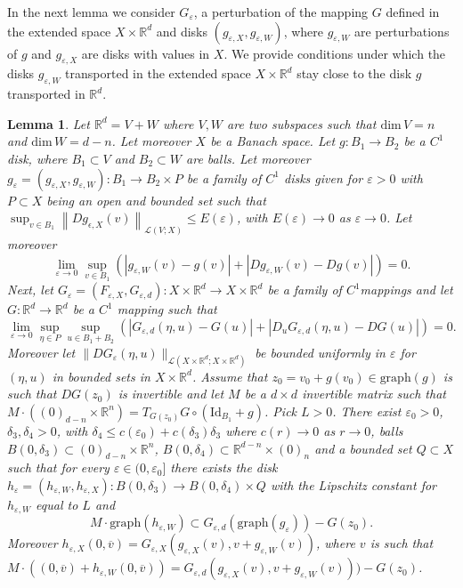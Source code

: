 \documentclass[11pt, leqno]{amsart}
\newtheorem{lem}[thm]{Lemma}
\theoremstyle{definition}
\def\R{\mathbb{R}}
\begin{document}
	In the next lemma we consider $G_\varepsilon$, a perturbation of the mapping $G$ defined in the extended space $X\times \R^d$ and disks $(g_{\varepsilon,X},g_{\varepsilon,W})$, where $g_{\varepsilon,W}$ are perturbations of $g$ and $g_{\varepsilon,X}$ are disks with values in $X$. We provide conditions under which the disks $g_{\varepsilon,W}$ transported in the extended space $X\times \R^d$ stay close  to the disk $g$ transported in $\R^d$.    	 	
	 	
	 	\begin{lem} \label{lem:transport_eps} Let $\R^d=V+W$ where $V,W$ are two subspaces such that $\text{dim}\, V = n$ and $\text{dim}\, W = d-n$. Let moreover $X$ be a Banach space. Let $g:B_1\to B_2$ be a $C^1$  disk, where $B_1\subset V$ and $B_2 \subset W$ are balls.  Let moreover $g_\varepsilon=(g_{\varepsilon,X},g_{\varepsilon,W}):B_1\to B_2\times P$ be a family of $C^1$  disks given for $\varepsilon>0$ with $P\subset X$ being an open and bounded set such that $\sup_{v\in B_1}\left\|Dg_{\epsilon,X}(v)\right\|_{\mathcal{L}(V;X)} \leq E(\varepsilon)$, with $E(\varepsilon)\to 0$ as $\varepsilon\to 0$. Let moreover 
	 		$$
	 		\lim_{\varepsilon\to 0}\sup_{v\in B_1}\left(|g_{\varepsilon,W}(v)-g(v)|+\left|D g_{\varepsilon,W}(v)-D g(v)\right|\right) = 0.
	 		$$
	 		Next, let $G_\varepsilon=(F_{\varepsilon,X},G_{\varepsilon,d}):X \times \R^d\to X\times \R^d$ be a family of $C^1 $mappings and let $G:\R^d\to \R^d$ be a $C^1$ mapping such that
	 		$$
	 		\lim_{\varepsilon\to 0}\sup_{\eta\in P}\sup_{u\in B_1+B_2}\left(|G_{\varepsilon,d}(\eta,u)-G(u)|+\left|D_uG_{\varepsilon,d}(\eta,u)-DG(u)\right|\right)=0.
	 		$$ Moreover let $\|D G_{\varepsilon}(\eta,u)\|_{\mathcal{L}(X\times \R^d;X\times \R^d)}$ be bounded uniformly in $\varepsilon$ for $(\eta,u)$ in bounded sets in $X\times \R^d$. Assume that $z_0 = v_0+g(v_0) \in \text{graph}(g)$ is such that $DG(z_0)$  is invertible and let $M$ be a $d\times d$  invertible matrix such that $M\cdot((0)_{d-n}\times \R^n) = T_{G(z_0)}G\circ (\textrm{Id}_{B_1}+g)$. Pick $L>0$. There exist $\varepsilon_0>0$, $\delta_3, \delta_4>0$, with $\delta_4\leq c(\varepsilon_0)+c(\delta_3)\delta_3$ where $c(r)\to 0$ as $r\to 0$,  balls $B(0,\delta_3)\subset  (0)_{d-n} \times \R^n$, $B(0,\delta_4)\subset  \R^{d-n} \times (0)_n$ and a bounded set  $Q \subset X$ such that for every $\varepsilon\in (0,\varepsilon_0]$ there exists the  disk $h_\varepsilon=(h_{\varepsilon,W},h_{\varepsilon,X}):B(0,\delta_3)\to B(0,\delta_4)\times Q$ with the Lipschitz constant for $h_{\varepsilon,W}$ equal to $L$ and 
	 		$$
	 		 M \cdot \text{graph}(h_{\varepsilon,W}) \subset G_{\varepsilon,d}(\text{graph}(g_\varepsilon))-G(z_0).
$$
Moreover $h_{\varepsilon,X}(0,\overline{v}) = G_{\varepsilon,X}(g_{\varepsilon,X}(v),v+g_{\varepsilon,W}(v))$, where $v$ is such that $	 		 M \cdot ((0,\overline{v})+h_{\varepsilon,W}(0,\overline{v})) =  G_{\varepsilon,d}(g_{\varepsilon,X}(v),v+g_{\varepsilon,W}(v)))-G(z_0)
$.
	 		\end{lem}
\end{document}
